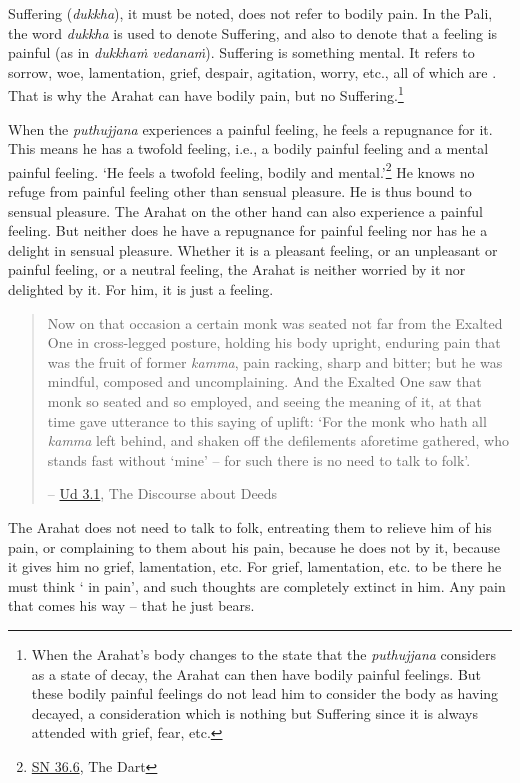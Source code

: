 Suffering (\emph{dukkha}), it must be noted, does not refer to bodily pain. In the Pali, the word \emph{dukkha} is used to denote Suffering, and also to denote that a feeling is painful (as in \emph{dukkhaṁ vedanaṁ}). Suffering is something mental. It refers to sorrow, woe, lamentation, grief, despair, agitation, worry, etc., all of which are . That is why the Arahat can have bodily pain, but no Suffering.\footnote{When the Arahat's body changes to the state that the \emph{puthujjana} considers as a state of decay, the Arahat can then have bodily painful feelings. But these bodily painful feelings do not lead him to consider the body as having decayed, a consideration which is nothing but Suffering since it is always attended with grief, fear, etc.}

When the \emph{puthujjana} experiences a painful feeling, he feels a repugnance for it. This means he has a twofold feeling, i.e., a bodily painful feeling and a mental painful feeling. `He feels a twofold feeling, bodily and mental.'\footnote{\href{https://suttacentral.net/sn36.6/en/bodhi}{SN 36.6}, The Dart} He knows no refuge from painful feeling other than sensual pleasure. He is thus bound to sensual pleasure. The Arahat on the other hand can also experience a painful feeling. But neither does he have a repugnance for painful feeling nor has he a delight in sensual pleasure. Whether it is a pleasant feeling, or an unpleasant or painful feeling, or a neutral feeling, the Arahat is neither worried by it nor delighted by it. For him, it is just a feeling.

\begin{quote}
Now on that occasion a certain monk was seated not far from the Exalted One in cross-legged posture, holding his body upright, enduring pain that was the fruit of former \emph{kamma}, pain racking, sharp and bitter; but he was mindful, composed and uncomplaining. And the Exalted One saw that monk so seated and so employed, and seeing the meaning of it, at that time gave utterance to this saying of uplift: `For the monk who hath all \emph{kamma} left behind, and shaken off the defilements aforetime gathered, who stands fast without `mine' -- for such there is no need to talk to folk'.

 -- \href{https://suttacentral.net/ud3.1/en/anandajoti}{Ud 3.1}, The Discourse about Deeds
\end{quote}

The Arahat does not need to talk to folk, entreating them to relieve him of his pain, or complaining to them about his pain, because he does not  by it, because it gives him no grief, lamentation, etc. For grief, lamentation, etc. to be there he must think ` in pain', and such thoughts are completely extinct in him. Any pain that comes his way -- that he just bears.

